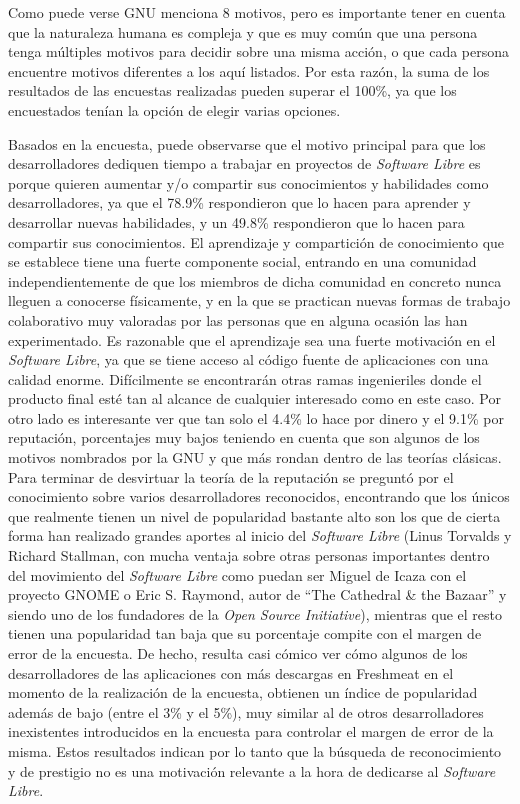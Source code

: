 Como puede verse GNU menciona 8 motivos, pero es importante tener en cuenta que la naturaleza humana es compleja y que es muy común que una persona tenga múltiples motivos para decidir sobre una misma acción, o que cada persona encuentre motivos diferentes a los aquí listados. Por esta razón, la suma de los resultados de las encuestas realizadas pueden superar el 100\%, ya que los encuestados tenían la opción de elegir varias opciones.

Basados en la encuesta, puede observarse que el motivo principal para que los desarrolladores dediquen tiempo a trabajar en proyectos de \textit{Software Libre} es porque quieren aumentar y/o compartir sus conocimientos y habilidades como desarrolladores, ya que el 78.9\% respondieron que lo hacen para aprender y desarrollar nuevas habilidades, y un 49.8\% respondieron que lo hacen para compartir sus conocimientos.
El aprendizaje y compartición de conocimiento que se establece tiene una fuerte componente social, entrando en una comunidad independientemente de que los miembros de dicha comunidad en concreto nunca lleguen a conocerse físicamente, y en la que se practican nuevas formas de trabajo colaborativo muy valoradas por las personas que en alguna ocasión las han experimentado.
Es razonable que el aprendizaje sea una fuerte motivación en el \textit{Software Libre}, ya que se tiene acceso al código fuente de aplicaciones con una calidad enorme. Difícilmente se encontrarán otras ramas ingenieriles donde el producto final esté tan al alcance de cualquier interesado como en este caso.
Por otro lado es interesante ver que tan solo el 4.4\% lo hace por dinero y el 9.1\% por reputación, porcentajes muy bajos teniendo en cuenta que son algunos de los motivos nombrados por la GNU y que más rondan dentro de las teorías clásicas.
Para terminar de desvirtuar la teoría de la reputación se preguntó por el conocimiento sobre varios desarrolladores reconocidos, encontrando que los únicos que realmente tienen un nivel de popularidad bastante alto son los que de cierta forma han realizado grandes aportes al inicio del \textit{Software Libre}
(Linus Torvalds y Richard Stallman, con mucha ventaja sobre otras personas importantes dentro del movimiento del \textit{Software Libre} como puedan ser Miguel de Icaza con el proyecto GNOME o Eric S. Raymond, autor de ``The Cathedral \& the Bazaar'' y siendo uno de los fundadores de la \textit{Open Source Initiative}), mientras que el resto tienen una popularidad tan baja que su porcentaje compite con el margen de error de la encuesta. De hecho, resulta casi cómico ver cómo algunos de los desarrolladores de las aplicaciones con más descargas en Freshmeat en el momento de la realización de la encuesta, obtienen un índice de popularidad además de bajo (entre el 3\% y el 5\%), muy similar al de otros desarrolladores inexistentes introducidos en la encuesta para controlar el margen de error de la misma. Estos resultados indican por lo tanto que la búsqueda de reconocimiento y de prestigio no es una motivación relevante a la hora de dedicarse al \textit{Software Libre}.
